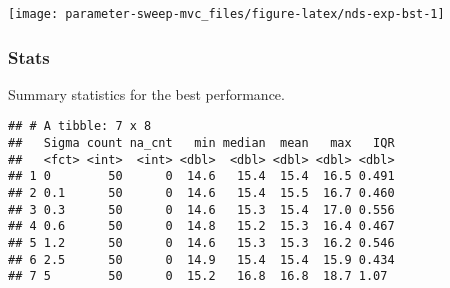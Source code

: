 \documentclass[]{book}
\newenvironment{Shaded}{\begin{snugshade}}{\end{snugshade}}
\newcommand{\DataTypeTok}[1]{\textcolor[rgb]{0.13,0.29,0.53}{#1}}
\newcommand{\KeywordTok}[1]{\textcolor[rgb]{0.13,0.29,0.53}{\textbf{#1}}}
\newcommand{\NormalTok}[1]{#1}
\newcommand{\OperatorTok}[1]{\textcolor[rgb]{0.81,0.36,0.00}{\textbf{#1}}}
\newcommand{\OtherTok}[1]{\textcolor[rgb]{0.56,0.35,0.01}{#1}}
\newcommand{\StringTok}[1]{\textcolor[rgb]{0.31,0.60,0.02}{#1}}
\begin{document}
\texttt{[image: parameter-sweep-mvc\_files/figure-latex/nds-exp-bst-1]}

\hypertarget{stats-40}{%
\subsubsection{Stats}\label{stats-40}}

Summary statistics for the best performance.

\begin{Shaded}
\end{Shaded}

\begin{verbatim}
## # A tibble: 7 x 8
##   Sigma count na_cnt   min median  mean   max   IQR
##   <fct> <int>  <int> <dbl>  <dbl> <dbl> <dbl> <dbl>
## 1 0        50      0  14.6   15.4  15.4  16.5 0.491
## 2 0.1      50      0  14.6   15.4  15.5  16.7 0.460
## 3 0.3      50      0  14.6   15.3  15.4  17.0 0.556
## 4 0.6      50      0  14.8   15.2  15.3  16.4 0.467
## 5 1.2      50      0  14.6   15.3  15.3  16.2 0.546
## 6 2.5      50      0  14.9   15.4  15.4  15.9 0.434
## 7 5        50      0  15.2   16.8  16.8  18.7 1.07
\end{verbatim}
\end{document}
